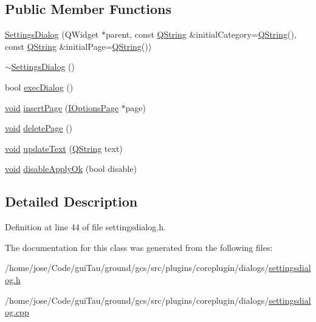 \subsection*{Public Member Functions}
\begin{DoxyCompactItemize}
\item 
\hyperlink{group___core_plugin_ga15d13d2725ef5ddc0ab97577109c1cfe}{Settings\-Dialog} (Q\-Widget $\ast$parent, const \hyperlink{group___u_a_v_objects_plugin_gab9d252f49c333c94a72f97ce3105a32d}{Q\-String} \&initial\-Category=\hyperlink{group___u_a_v_objects_plugin_gab9d252f49c333c94a72f97ce3105a32d}{Q\-String}(), const \hyperlink{group___u_a_v_objects_plugin_gab9d252f49c333c94a72f97ce3105a32d}{Q\-String} \&initial\-Page=\hyperlink{group___u_a_v_objects_plugin_gab9d252f49c333c94a72f97ce3105a32d}{Q\-String}())
\item 
\hyperlink{group___core_plugin_gac48f54d4472902be0a3845a69167f068}{$\sim$\-Settings\-Dialog} ()
\item 
bool \hyperlink{group___core_plugin_ga39aeb933e3a9148592563c484cbce0cb}{exec\-Dialog} ()
\item 
\hyperlink{group___u_a_v_objects_plugin_ga444cf2ff3f0ecbe028adce838d373f5c}{void} \hyperlink{group___core_plugin_gaac5454d19f41ea69a14868db50b1622b}{insert\-Page} (\hyperlink{class_core_1_1_i_options_page}{I\-Options\-Page} $\ast$page)
\item 
\hyperlink{group___u_a_v_objects_plugin_ga444cf2ff3f0ecbe028adce838d373f5c}{void} \hyperlink{group___core_plugin_ga793f737602119510b036427f3d34929f}{delete\-Page} ()
\item 
\hyperlink{group___u_a_v_objects_plugin_ga444cf2ff3f0ecbe028adce838d373f5c}{void} \hyperlink{group___core_plugin_ga1724de2aa0c997d8556d99509e5bef87}{update\-Text} (\hyperlink{group___u_a_v_objects_plugin_gab9d252f49c333c94a72f97ce3105a32d}{Q\-String} text)
\item 
\hyperlink{group___u_a_v_objects_plugin_ga444cf2ff3f0ecbe028adce838d373f5c}{void} \hyperlink{group___core_plugin_ga4b64e9e3302318997b8e274874419a08}{disable\-Apply\-Ok} (bool disable)
\end{DoxyCompactItemize}


\subsection{Detailed Description}


Definition at line 44 of file settingsdialog.\-h.



The documentation for this class was generated from the following files\-:\begin{DoxyCompactItemize}
\item 
/home/jose/\-Code/gui\-Tau/ground/gcs/src/plugins/coreplugin/dialogs/\hyperlink{settingsdialog_8h}{settingsdialog.\-h}\item 
/home/jose/\-Code/gui\-Tau/ground/gcs/src/plugins/coreplugin/dialogs/\hyperlink{settingsdialog_8cpp}{settingsdialog.\-cpp}\end{DoxyCompactItemize}
